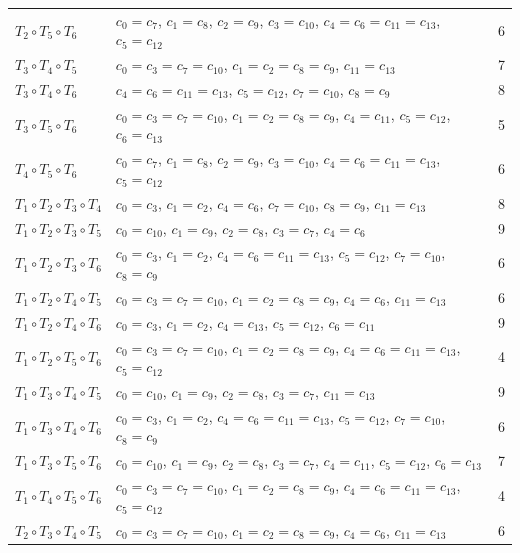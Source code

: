 \documentclass{article}
\begin{document}
{\begin{longtable}{l l c}
$T_2 \circ T_5 \circ T_6$ & $c_0 = c_7$, $c_1 = c_8$, $c_2 = c_9$, $c_3 = c_{10}$, $c_4 = c_6 = c_{11} = c_{13}$, $c_5 = c_{12}$ & 6 \\
$T_3 \circ T_4 \circ T_5$ & $c_0 = c_3 = c_7 = c_{10}$, $c_1 = c_2 = c_8 = c_9$, $c_{11} = c_{13}$ & 7 \\
$T_3 \circ T_4 \circ T_6$ & $c_4 = c_6 = c_{11} = c_{13}$, $c_5 = c_{12}$, $c_7 = c_{10}$, $c_8 = c_9$ & 8 \\
$T_3 \circ T_5 \circ T_6$ & $c_0 = c_3 = c_7 = c_{10}$, $c_1 = c_2 = c_8 = c_9$, $c_4 = c_{11}$, $c_5 = c_{12}$, $c_6 = c_{13}$ & 5 \\
$T_4 \circ T_5 \circ T_6$ & $c_0 = c_7$, $c_1 = c_8$, $c_2 = c_9$, $c_3 = c_{10}$, $c_4 = c_6 = c_{11} = c_{13}$, $c_5 = c_{12}$ & 6 \\
$T_1 \circ T_2 \circ T_3 \circ T_4$ & $c_0 = c_3$, $c_1 = c_2$, $c_4 = c_6$, $c_7 = c_{10}$, $c_8 = c_9$, $c_{11} = c_{13}$ & 8 \\
$T_1 \circ T_2 \circ T_3 \circ T_5$ & $c_0 = c_{10}$, $c_1 = c_9$, $c_2 = c_8$, $c_3 = c_7$, $c_4 = c_6$ & 9 \\
$T_1 \circ T_2 \circ T_3 \circ T_6$ & $c_0 = c_3$, $c_1 = c_2$, $c_4 = c_6 = c_{11} = c_{13}$, $c_5 = c_{12}$, $c_7 = c_{10}$, $c_8 = c_9$ & 6 \\
$T_1 \circ T_2 \circ T_4 \circ T_5$ & $c_0 = c_3 = c_7 = c_{10}$, $c_1 = c_2 = c_8 = c_9$, $c_4 = c_6$, $c_{11} = c_{13}$ & 6 \\
$T_1 \circ T_2 \circ T_4 \circ T_6$ & $c_0 = c_3$, $c_1 = c_2$, $c_4 = c_{13}$, $c_5 = c_{12}$, $c_6 = c_{11}$ & 9 \\
$T_1 \circ T_2 \circ T_5 \circ T_6$ & $c_0 = c_3 = c_7 = c_{10}$, $c_1 = c_2 = c_8 = c_9$, $c_4 = c_6 = c_{11} = c_{13}$, $c_5 = c_{12}$ & 4 \\
$T_1 \circ T_3 \circ T_4 \circ T_5$ & $c_0 = c_{10}$, $c_1 = c_9$, $c_2 = c_8$, $c_3 = c_7$, $c_{11} = c_{13}$ & 9 \\
$T_1 \circ T_3 \circ T_4 \circ T_6$ & $c_0 = c_3$, $c_1 = c_2$, $c_4 = c_6 = c_{11} = c_{13}$, $c_5 = c_{12}$, $c_7 = c_{10}$, $c_8 = c_9$ & 6 \\
$T_1 \circ T_3 \circ T_5 \circ T_6$ & $c_0 = c_{10}$, $c_1 = c_9$, $c_2 = c_8$, $c_3 = c_7$, $c_4 = c_{11}$, $c_5 = c_{12}$, $c_6 = c_{13}$ & 7 \\
$T_1 \circ T_4 \circ T_5 \circ T_6$ & $c_0 = c_3 = c_7 = c_{10}$, $c_1 = c_2 = c_8 = c_9$, $c_4 = c_6 = c_{11} = c_{13}$, $c_5 = c_{12}$ & 4 \\
$T_2 \circ T_3 \circ T_4 \circ T_5$ & $c_0 = c_3 = c_7 = c_{10}$, $c_1 = c_2 = c_8 = c_9$, $c_4 = c_6$, $c_{11} = c_{13}$ & 6 \\

\end{longtable}}
\end{document}
